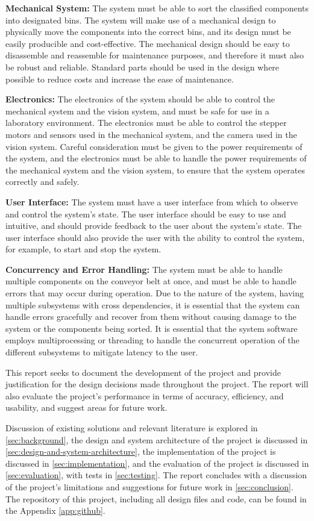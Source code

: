 \textbf{Mechanical System:} The system must be able to sort the classified components into designated bins. The system will make use of a mechanical design to physically move the components into the correct bins, and its design must be easily producible and cost-effective. The mechanical design should be easy to disassemble and reassemble for maintenance purposes, and therefore it must also be robust and reliable. Standard parts should be used in the design where possible to reduce costs and increase the ease of maintenance.

\textbf{Electronics:} The electronics of the system should be able to control the mechanical system and the vision system, and must be safe for use in a laboratory environment. The electronics must be able to control the stepper motors and sensors used in the mechanical system, and the camera used in the vision system. Careful consideration must be given to the power requirements of the system, and the electronics must be able to handle the power requirements of the mechanical system and the vision system, to ensure that the system operates correctly and safely.

\textbf{User Interface:} The system must have a user interface from which to observe and control the system's state. The user interface should be easy to use and intuitive, and should provide feedback to the user about the system's state. The user interface should also provide the user with the ability to control the system, for example, to start and stop the system.

\textbf{Concurrency and Error Handling:} The system must be able to handle multiple components on the conveyor belt at once, and must be able to handle errors that may occur during operation. Due to the nature of the system, having multiple subsystems with cross dependencies, it is essential that the system can handle errors gracefully and recover from them without causing damage to the system or the components being sorted. It is essential that the system software employs multiprocessing or threading to handle the concurrent operation of the different subsystems to mitigate latency to the user.

This report seeks to document the development of the project and provide justification for the design decisions made throughout the project. The report will also evaluate the project's performance in terms of accuracy, efficiency, and usability, and suggest areas for future work.

Discussion of existing solutions and relevant literature is explored in \autoref{sec:background}, the design and system architecture of the project is discussed in \autoref{sec:design-and-system-architecture}, the implementation of the project is discussed in \autoref{sec:implementation}, and the evaluation of the project is discussed in \autoref{sec:evaluation}, with tests in \autoref{sec:testing}. The report concludes with a discussion of the project's limitations and suggestions for future work in \autoref{sec:conclusion}. The repository of this project, including all design files and code, can be found in the Appendix \ref{app:github}.

